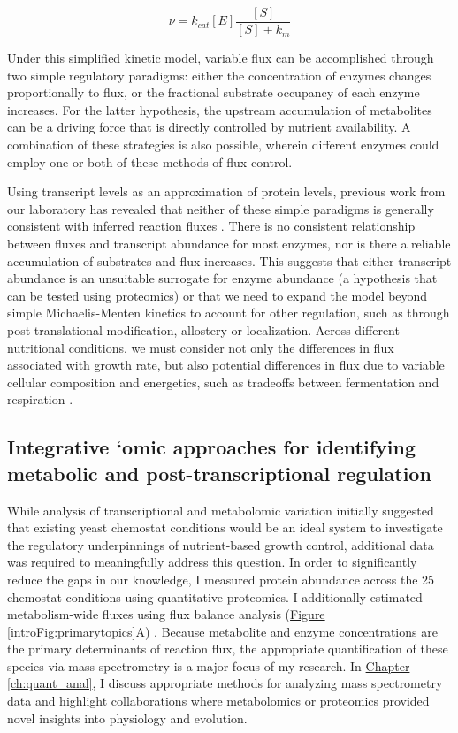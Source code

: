 \begin{equation}
\nu = k_{cat}\left[E\right]\frac{\left[S\right]}{\left[S\right] + k_{m}}\label{intoEqtn:mm}
\end{equation}

Under this simplified kinetic model, variable flux can be accomplished through two simple regulatory paradigms: either the concentration of enzymes changes proportionally to flux, or the fractional substrate occupancy of each enzyme increases. For the latter hypothesis, the upstream accumulation of metabolites can be a driving force that is directly controlled by nutrient availability. A combination of these strategies is also possible, wherein different enzymes could employ one or both of these methods of flux-control. 

Using transcript levels as an approximation of protein levels, previous work from our laboratory has revealed that neither of these simple paradigms is generally consistent with inferred reaction fluxes \cite{Bradley:2009fj}. There is no consistent relationship between fluxes and transcript abundance for most enzymes, nor is there a reliable accumulation of substrates and flux increases. This suggests that either transcript abundance is an unsuitable surrogate for enzyme abundance (a hypothesis that can be tested using proteomics) or that we need to expand the model beyond simple Michaelis-Menten kinetics to account for other regulation, such as through post-translational modification, allostery or localization. Across different nutritional conditions, we must consider not only the differences in flux associated with growth rate, but also potential differences in flux due to variable cellular composition and energetics, such as tradeoffs between fermentation and respiration \cite{Lange:2001th, Feist:2010hq, BARFORD:1979ei}.

\subsection{Integrative `omic approaches for identifying metabolic and post-transcriptional regulation}

While analysis of transcriptional and metabolomic variation initially suggested that existing yeast chemostat conditions would be an ideal system to investigate the regulatory underpinnings of nutrient-based growth control, additional data was required to meaningfully address this question. In order to significantly reduce the gaps in our knowledge, I measured protein abundance across the 25 chemostat conditions using quantitative proteomics. I additionally estimated metabolism-wide fluxes using flux balance analysis (\hyperref[introFig:primarytopics]{Figure \ref{introFig:primarytopics}A}) \cite{Orth:2010hb}. Because metabolite and enzyme concentrations are the primary determinants of reaction flux, the appropriate quantification of these species via mass spectrometry is a major focus of my research. In \hyperref[ch:quant_anal]{Chapter \ref{ch:quant_anal}}, I discuss appropriate methods for analyzing mass spectrometry data and highlight collaborations where metabolomics or proteomics provided novel insights into physiology and evolution. 

